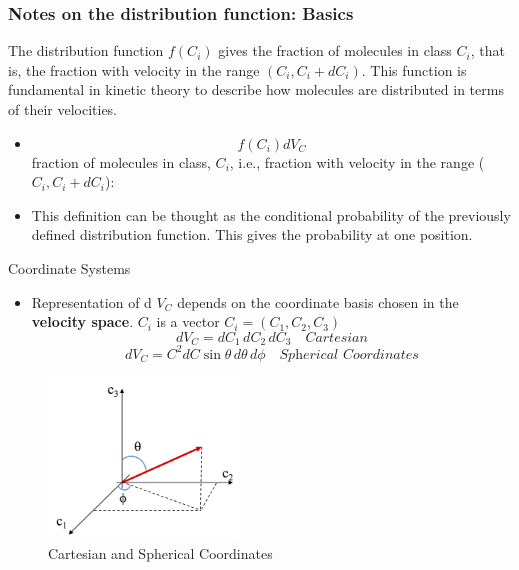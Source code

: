 \documentclass{beamer}
\begin{document}
\begin{frame}
\frametitle{Notes on the distribution function: Basics}
The distribution function \( f(C_i) \) gives the fraction of molecules in class \( C_i \), that is, the fraction with velocity in the range \( (C_i, C_i + dC_i) \). This function is fundamental in kinetic theory to describe how molecules are distributed in terms of their velocities.\\
\begin{itemize}

    \item 
     $$
    f(C_i) dV_C     
    $$
    fraction of molecules in class, $C_i$, i.e., fraction with velocity in the range ($C_i, C_i+d C_i$):
   \item This definition can be thought as the conditional probability of the previously defined distribution function. This gives the probability at one position.
   
\end{itemize}

\end{frame}
\begin{frame}{Coordinate Systems}
\begin{itemize}

  \item Representation of d $V_C$ depends on the coordinate basis chosen in the {\bf velocity space}.
    $C_i$ is a vector $C_i = (C_1, C_2, C_3)$
    $$
    dV_C = dC_1 \, dC_2 \, dC_3 \quad \textit{Cartesian}
    $$
    $$
     dV_C = C^2 dC \sin{\theta} \, d {\theta} \, d {\phi} \quad \textit{Spherical Coordinates}
    $$
\end{itemize}
\begin{figure}
        \centering
        \includegraphics[width=0.45\textwidth]{coord.png}
        \caption{Cartesian and Spherical Coordinates}
    \end{figure}
\end{frame}
\end{document}
